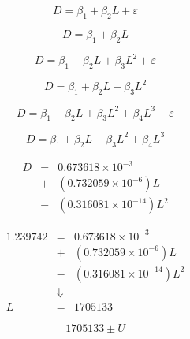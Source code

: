 \batchmode
{}
\makeatletter

\makeatother
\newenvironment{tex2html_wrap}{}{}
\newwrite\lthtmlwrite
\def\lthtmltypeout#1{{\let\protect\string\immediate\write\lthtmlwrite{#1}}}%
\newbox\sizebox

\pagestyle{empty}
{\newpage
\clearpage
\samepage \begin{displaymath}D = \beta_1 + \beta_2L + \varepsilon
\end{displaymath}
}

{\newpage
\clearpage
\samepage \begin{displaymath}D = \beta_1 + \beta_2L
\end{displaymath}
}

{\newpage
\clearpage
\samepage \begin{displaymath}D = \beta_1 + \beta_2L + \beta_3L^2 + \varepsilon
\end{displaymath}
}

{\newpage
\clearpage
\samepage \begin{displaymath}D = \beta_1 + \beta_2L + \beta_3L^2
\end{displaymath}
}

{\newpage
\clearpage
\samepage \begin{displaymath}D = \beta_1 + \beta_2L + \beta_3L^2 + \beta_4L^3 + \varepsilon
\end{displaymath}
}

{\newpage
\clearpage
\samepage \begin{displaymath}D = \beta_1 + \beta_2L + \beta_3L^2 + \beta_4L^3
\end{displaymath}
}

{\newpage
\clearpage
\samepage \begin{eqnarray*}D & = & 0.673618\times10^{-3}  \\ 
  & + & (0.732059\times10^{-6})L  \\ 
  & - & (0.316081\times10^{-14})L^2
\end{eqnarray*}
}

{\newpage
\clearpage
\samepage \begin{eqnarray*}1.239742 & = & 0.673618\times10^{-3}  \\ 
         & + & (0.732059\times10^{-6})L  \\ 
         & - & (0.316081\times10^{-14})L^2  \\ 
         &   \Downarrow & \\ 
      L  & = &  1705133
\end{eqnarray*}
}

{\newpage
\clearpage
\samepage \begin{displaymath}1705133 \pm U
\end{displaymath}
}



